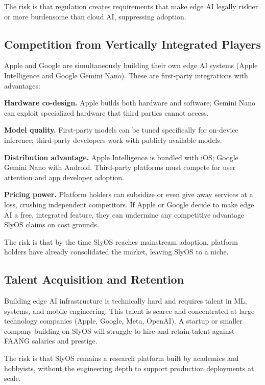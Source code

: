 \documentclass[12pt, letterpaper, twoside]{report}
\begin{document}
The risk is that regulation creates requirements that make edge AI legally riskier or more burdensome than cloud AI, suppressing adoption.

\subsection{Competition from Vertically Integrated Players}
\label{subsec:competition_risk}

Apple and Google are simultaneously building their own edge AI systems (Apple Intelligence and Google Gemini Nano). These are first-party integrations with advantages:

\textbf{Hardware co-design.} Apple builds both hardware and software; Gemini Nano can exploit specialized hardware that third parties cannot access.

\textbf{Model quality.} First-party models can be tuned specifically for on-device inference; third-party developers work with publicly available models.

\textbf{Distribution advantage.} Apple Intelligence is bundled with iOS; Google Gemini Nano with Android. Third-party platforms must compete for user attention and app developer adoption.

\textbf{Pricing power.} Platform holders can subsidize or even give away services at a loss, crushing independent competitors. If Apple or Google decide to make edge AI a free, integrated feature, they can undermine any competitive advantage SlyOS claims on cost grounds.

The risk is that by the time SlyOS reaches mainstream adoption, platform holders have already consolidated the market, leaving SlyOS to a niche.

\subsection{Talent Acquisition and Retention}
\label{subsec:talent_risk}

Building edge AI infrastructure is technically hard and requires talent in ML, systems, and mobile engineering. This talent is scarce and concentrated at large technology companies (Apple, Google, Meta, OpenAI). A startup or smaller company building on SlyOS will struggle to hire and retain talent against FAANG salaries and prestige.

The risk is that SlyOS remains a research platform built by academics and hobbyists, without the engineering depth to support production deployments at scale.
\end{document}

